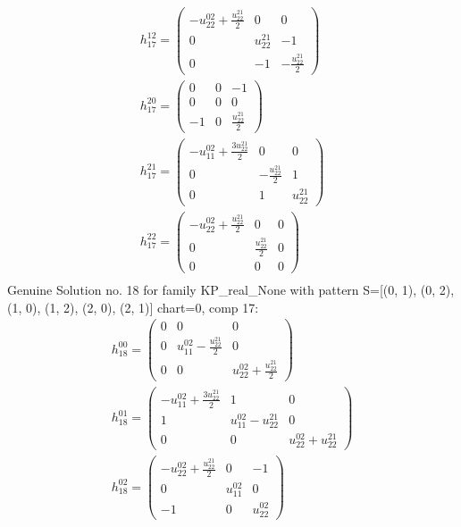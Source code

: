 \documentclass[a4paper, 11pt, twoside, onecolumn]{article}
\begin{document}
\begin{landscape}
\begin{gather*}
	 h_{17}^{12}=\begin{pmatrix}- u^{02}_{22} + \frac{u^{21}_{22}}{2} & 0 & 0\\0 & u^{21}_{22} & -1\\0 & -1 & - \frac{u^{21}_{22}}{2}\end{pmatrix}\\ 
	 h_{17}^{20}=\begin{pmatrix}0 & 0 & -1\\0 & 0 & 0\\-1 & 0 & \frac{u^{21}_{22}}{2}\end{pmatrix}\\ 
	 h_{17}^{21}=\begin{pmatrix}- u^{02}_{11} + \frac{3 u^{21}_{22}}{2} & 0 & 0\\0 & - \frac{u^{21}_{22}}{2} & 1\\0 & 1 & u^{21}_{22}\end{pmatrix}\\ 
	 h_{17}^{22}=\begin{pmatrix}- u^{02}_{22} + \frac{u^{21}_{22}}{2} & 0 & 0\\0 & \frac{u^{21}_{22}}{2} & 0\\0 & 0 & 0\end{pmatrix}\\ 
\end{gather*} 
Genuine Solution no. 18 for family KP_real_None with pattern S=[(0, 1), (0, 2), (1, 0), (1, 2), (2, 0), (2, 1)] chart=0, comp 17: 
\begin{gather*} 
	 h_{18}^{00}=\begin{pmatrix}0 & 0 & 0\\0 & u^{02}_{11} - \frac{u^{21}_{22}}{2} & 0\\0 & 0 & u^{02}_{22} + \frac{u^{21}_{22}}{2}\end{pmatrix}\\ 
	 h_{18}^{01}=\begin{pmatrix}- u^{02}_{11} + \frac{3 u^{21}_{22}}{2} & 1 & 0\\1 & u^{02}_{11} - u^{21}_{22} & 0\\0 & 0 & u^{02}_{22} + u^{21}_{22}\end{pmatrix}\\ 
	 h_{18}^{02}=\begin{pmatrix}- u^{02}_{22} + \frac{u^{21}_{22}}{2} & 0 & -1\\0 & u^{02}_{11} & 0\\-1 & 0 & u^{02}_{22}\end{pmatrix}\\ 

\end{gather*}
\end{landscape}
\end{document}
